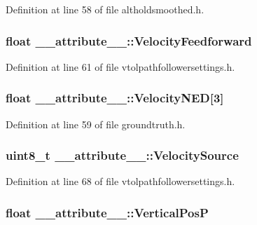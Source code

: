 \-Definition at line 58 of file altholdsmoothed.\-h.

\hypertarget{struct____attribute_____a9e2884654ba2699184d8c8a1c9af28c9}{
\subsubsection[{\-Velocity\-Feedforward}]{\setlength{\rightskip}{0pt plus 5cm}float {\bf \-\_\-\-\_\-attribute\-\_\-\-\_\-\-::\-Velocity\-Feedforward}}}\label{struct____attribute_____a9e2884654ba2699184d8c8a1c9af28c9}


\-Definition at line 61 of file vtolpathfollowersettings.\-h.

\hypertarget{struct____attribute_____ae017d52e534be49fcd02a71e636e359e}{
\subsubsection[{\-Velocity\-N\-E\-D}]{\setlength{\rightskip}{0pt plus 5cm}float {\bf \-\_\-\-\_\-attribute\-\_\-\-\_\-\-::\-Velocity\-N\-E\-D}\mbox{[}3\mbox{]}}}\label{struct____attribute_____ae017d52e534be49fcd02a71e636e359e}


\-Definition at line 59 of file groundtruth.\-h.

\hypertarget{struct____attribute_____a34884fadde4fcaea636ad6f09e7ef998}{
\subsubsection[{\-Velocity\-Source}]{\setlength{\rightskip}{0pt plus 5cm}uint8\-\_\-t {\bf \-\_\-\-\_\-attribute\-\_\-\-\_\-\-::\-Velocity\-Source}}}\label{struct____attribute_____a34884fadde4fcaea636ad6f09e7ef998}


\-Definition at line 68 of file vtolpathfollowersettings.\-h.

\hypertarget{struct____attribute_____a51dd6a69f5fd020059291f5b2cdf6880}{
\subsubsection[{\-Vertical\-Pos\-P}]{\setlength{\rightskip}{0pt plus 5cm}float {\bf \-\_\-\-\_\-attribute\-\_\-\-\_\-\-::\-Vertical\-Pos\-P}}}\label{struct____attribute_____a51dd6a69f5fd020059291f5b2cdf6880}


